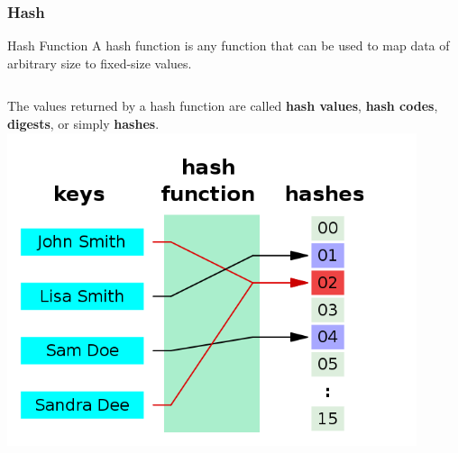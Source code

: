 \documentclass[aspectratio=169, 14pt]{beamer}
\begin{document}
\begin{frame}
    \frametitle{Hash}
    \begin{exampleblock}{Hash Function}
A hash function is any function that can be used to map data of arbitrary size to fixed-size values.        
    \end{exampleblock}

    \begin{columns}
        The values returned by a hash function are called \textbf{hash values}, \textbf{hash codes}, \textbf{digests}, or simply \textbf{hashes}.
        \includegraphics[width=0.9\textwidth]{week11/hashwiki}
    \end{columns}
\end{frame}
\end{document}
